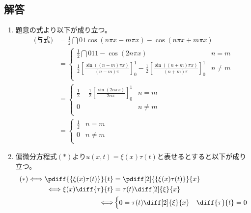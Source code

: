 \subsection{解答}
\begin{enumerate}[(1)]
    \item 題意の式より以下が成り立つ。
        \begin{align*}
            \mbox{(与式)} 
            & = \frac{1}{2}\dint{0}{1}{\cos (n\pi x - m\pi x) - \cos (n\pi x + m\pi x)}\\
            & = 
            \begin{cases}
                \frac{1}{2}\dint{0}{1}{1 - \cos (2n\pi x)} & n = m\\
                \frac{1}{2}\left[\frac{\sin ((n - m)\pi x)}{(n - m)\pi}\right]_{0}^{1} - \frac{1}{2}\left[\frac{\sin ((n + m)\pi x)}{(n + m)\pi}\right]_{0}^{1} & n \neq m\\
            \end{cases}\\
            & = 
            \begin{cases}
                \frac{1}{2} - \frac{1}{2}\left[\frac{\sin (2n\pi x)}{2n\pi}\right]_{0}^{1} & n = m\\
                0 & n \neq m\\
            \end{cases}\\
            & = 
            \begin{cases}
                \frac{1}{2} & n = m\\
                0 & n \neq m\\
            \end{cases}
        \end{align*}
    \item 偏微分方程式$(*)$より$u(x, t) = \xi (x)\tau (t)$と表せるとすると以下が成り立つ。
        \begin{align*}
            (*) \Longleftrightarrow
            \pdiff{\{\xi (x)\tau (t)\}}{t} & = \pdiff[2]{\{\xi (x)\tau (t)\}}{x}\\
            \Longleftrightarrow
            \xi (x)\diff{\tau}{t} & = \tau (t)\diff[2]{\xi}{x}\\
            \Longleftrightarrow&
            \begin{cases}
                0 = \tau (t)\diff[2]{\xi}{x} & \diff{\tau}{t} = 0\\
            \end{cases}
        \end{align*}

\end{enumerate}
